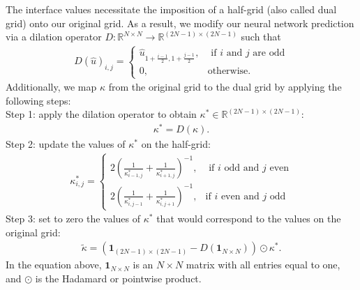 \documentclass[preprint,12pt]{elsarticle}
\begin{document}
The interface values necessitate the imposition of a half-grid (also called dual grid) onto our original grid. As a result, we modify our neural network prediction via a dilation operator $D:\mathbb{R}^{N \times N} \rightarrow \mathbb{R}^{(2N - 1) \times (2N - 1)}$ such that
\begin{align}
    D(\hat{u})_{i, j} = \begin{cases}
        \hat{u}_{1 + \frac{i-1}{2}, 1 + \frac{j-1}{2}}, & \text{ if } i \text{ and } j \text{ are odd} \\
        0, &\text{otherwise.}
    \end{cases}
\end{align}
Additionally, we map $\kappa$ from the original grid to the dual grid by applying the following steps:\\
Step 1: apply the dilation operator to obtain $\kappa^\ast\in\mathbb{R}^{(2N-1)\times(2N-1)}$:
\begin{align}
\kappa^\ast = D(\kappa).
\end{align}
Step 2: update the values of $\kappa^\ast$ on the half-grid:
\begin{align}
\kappa^{\ast}_{i,j} =  \begin{cases} 2\left(\frac{1}{\kappa^\ast_{i-1,j}} + \frac{1}{\kappa^\ast_{i+1, j}}\right)^{-1},  & \text{ if } i \text{ odd and  } j \text{ even} \\
    2\left(\frac{1}{\kappa^\ast_{i,j-1}} + \frac{1}{\kappa^\ast_{i, j+1}}\right)^{-1},  & \text{if } i \text{ even and } j \text{ odd} 
    \end{cases} 
\end{align}
Step 3: set to zero the values of $\kappa^\ast$ that would correspond to the values on the original grid:
\begin{align}
\tilde{\kappa} = \left( \mathbf{1}_{(2N - 1) \times (2N - 1)} - D(\mathbf{1}_{N \times N}) \right) \odot \kappa^\ast.
\end{align}
In the equation above, $\mathbf{1}_{N \times N}$ is an $N \times N$ matrix with all entries equal to one,  and $\odot$ is the Hadamard or pointwise product.
\end{document}
